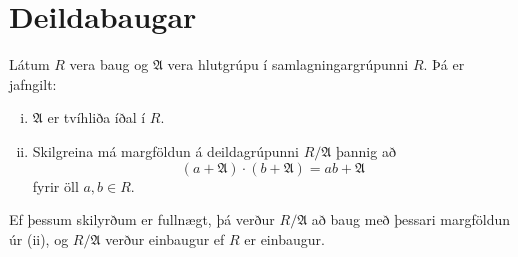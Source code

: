 \documentclass[a4paper,icelandic,11pt]{book}
\theoremstyle{plain}
\begin{document}
\section{Deildabaugar}
\begin{setn}
  Látum $R$ vera baug og $\mathfrak A$ vera hlutgrúpu í samlagningargrúpunni
  $R$. Þá er jafngilt:
  \begin{enumerate}[(i)]
    \item $\mathfrak A$ er tvíhliða íðal í $R$.
    \item Skilgreina má margföldun á deildagrúpunni $R/\mathfrak A$ þannig að\[
      (a + \mathfrak A)\cdot (b+\mathfrak A) = ab + \mathfrak A
      \]
      fyrir öll $a,b\in R$.
  \end{enumerate}
  Ef þessum skilyrðum er fullnægt, þá verður $R/\mathfrak A$ að baug með þessari
  margföldun úr (ii), og $R/\mathfrak A$ verður einbaugur ef $R$ er einbaugur.
\end{setn}
\end{document}
